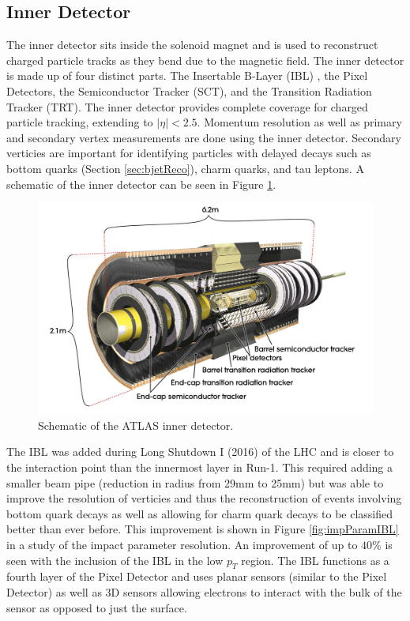 \subsection{Inner Detector}
\label{sec:InnerDet}
The inner detector sits inside the solenoid magnet and is used to reconstruct charged particle tracks as they bend due to the magnetic field.  The inner detector is made up of four distinct parts.  The Insertable B-Layer (IBL) \cite{Capeans:1291633}, the Pixel Detectors, the Semiconductor Tracker (SCT), and the Transition Radiation Tracker (TRT)\cite{CERN-LHCC-97-016}.  The inner detector provides complete coverage for charged particle tracking, extending to $|\eta|<2.5$.  Momentum resolution as well as primary and secondary vertex measurements are done using the inner detector.  Secondary verticies are important for identifying particles with delayed decays such as bottom quarks (Section \ref{sec:bjetReco}), charm quarks, and tau leptons. A schematic of the inner detector can be seen in Figure \ref{fig:ATLASInnerDet}.

\begin{figure}[ht!]
	\centering
	\includegraphics[width=0.8\columnwidth]{../ThesisImages/LHCImages/ATLASInnerDetector.png}
	\caption[Schematic of the ATLAS inner detector.]{Schematic of the ATLAS inner detector\cite{ATLAS}.
	}
	\label{fig:ATLASInnerDet}
\end{figure}

The IBL was added during Long Shutdown I (2016) of the LHC and is closer to the interaction point than the innermost layer in Run-1.  This required adding a smaller beam pipe (reduction in radius from 29mm to 25mm) but was able to improve the resolution of verticies and thus the reconstruction of events involving bottom quark decays as well as allowing for charm quark decays to be classified better than ever before.  This improvement is shown in Figure \ref{fig:impParamIBL} in a study of the impact parameter resolution.  An improvement of up to $40\%$ is seen with the inclusion of the IBL in the low $p_T$ region.  The IBL functions as a fourth layer of the Pixel Detector and uses planar sensors (similar to the Pixel Detector) as well as 3D sensors allowing electrons to interact with the bulk of the sensor as opposed to just the surface. 

